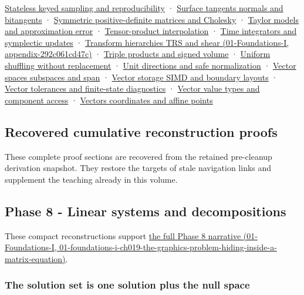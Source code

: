 \hyperref[appendix-daaf25bfd3a0]{Stateless keyed sampling and reproducibility} · \hyperref[appendix-e31893dec985]{Surface tangents normals and bitangents} · \hyperref[appendix-50d2ea3c9b26]{Symmetric positive-definite matrices and Cholesky} · \hyperref[appendix-32f39e9a3738]{Taylor models and approximation error} · \hyperref[appendix-0a09b6dfdc86]{Tensor-product interpolation} · \hyperref[appendix-8f96f9c4d5bc]{Time integrators and symplectic updates} · \href{../01-Foundations-I/main.pdf\#nameddest=appendix-292c061cd47c}{Transform hierarchies TRS and shear (01-Foundations-I, appendix-292c061cd47c)} · \hyperref[appendix-5caa058bd9c7]{Triple products and signed volume} · \hyperref[appendix-184fcc411663]{Uniform shuffling without replacement} · \hyperref[appendix-f744e41b95b4]{Unit directions and safe normalization} · \hyperref[appendix-173b52c063ae]{Vector spaces subspaces and span} · \hyperref[appendix-26bf6bf2fb8b]{Vector storage SIMD and boundary layouts} · \hyperref[appendix-b5b83329215b]{Vector tolerances and finite-state diagnostics} · \hyperref[appendix-37a39984ba66]{Vector value types and component access} · \hyperref[appendix-0659864c0aa3]{Vectors coordinates and affine points}

\subsection{Recovered cumulative reconstruction proofs}\label{02-foundations-ii-ch039-recovered-cumulative-reconstruction-proofs}

These complete proof sections are recovered from the retained pre-cleanup derivation snapshot. They restore the targets of stale navigation links and supplement the teaching already in this volume.

\subsection{Phase 8 - Linear systems and decompositions}\label{02-foundations-ii-ch039-phase-8---linear-systems-and-decompositions}

These compact reconstructions support \href{../01-Foundations-I/main.pdf\#nameddest=01-foundations-i-ch019-the-graphics-problem-hiding-inside-a-matrix-equation}{the full Phase 8 narrative (01-Foundations-I, 01-foundations-i-ch019-the-graphics-problem-hiding-inside-a-matrix-equation)}.

\subsubsection{The solution set is one solution plus the null space}\label{02-foundations-ii-ch039-the-solution-set-is-one-solution-plus-the-null-space}

